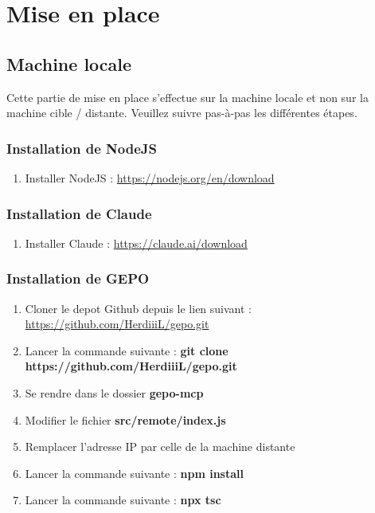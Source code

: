 \section{Mise en place}

\subsection*{Machine locale}

Cette partie de mise en place s'effectue sur la machine locale et non sur la machine cible / distante. Veuillez suivre pas-à-pas les différentes étapes. 

\subsubsection*{Installation de NodeJS}

\begin{enumerate}
    \item Installer NodeJS : \url{https://nodejs.org/en/download}
\end{enumerate}

\subsubsection*{Installation de Claude}

\begin{enumerate}
    \item Installer Claude : \url{https://claude.ai/download}
\end{enumerate}

\subsubsection*{Installation de GEPO}

\begin{enumerate}
    \item Cloner le depot Github depuis le lien suivant : \url{https://github.com/HerdiiiL/gepo.git}
    \item Lancer la commande suivante : \textbf{git clone https://github.com/HerdiiiL/gepo.git}
    \item Se rendre dans le dossier \textbf{gepo-mcp}
    \item Modifier le fichier \textbf{src/remote/index.js} 
    \item Remplacer l'adresse IP par celle de la machine distante
    \item Lancer la commande suivante : \textbf{npm install}
    \item Lancer la commande suivante : \textbf{npx tsc}
\end{enumerate}

